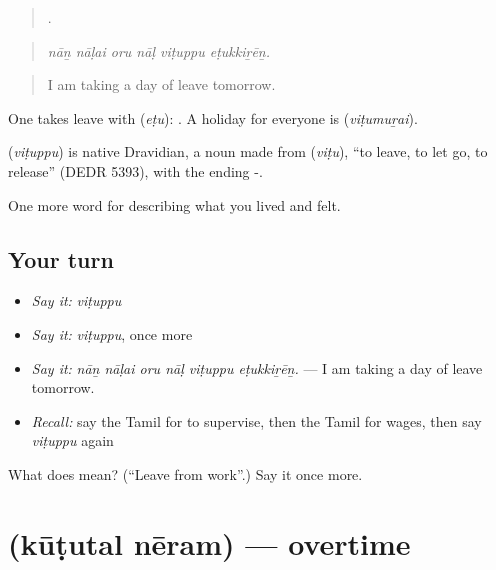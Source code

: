 \begin{quote}
     .
\end{quote}

\begin{quote}
\emph{nāṉ nāḷai oru nāḷ viṭuppu eṭukkiṟēṉ.}
\end{quote}

\begin{quote}
I am taking a day of leave tomorrow.
\end{quote}

One takes leave with  (\emph{eṭu}):  . A holiday for everyone is  (\emph{viṭumuṟai}).

\begin{cousinweb}
\textbf{} (\emph{viṭuppu}) is native Dravidian, a noun made from  (\emph{viṭu}), \textquotedblleft{}to leave, to let go, to release\textquotedblright{} (DEDR 5393), with the ending -.
\end{cousinweb}

\begin{grammarlens}[title={What you've built}]
One more word for describing what you lived and felt.
\end{grammarlens}

\subsection*{Your turn}
\begin{itemize}
\raggedright
  \item \emph{Say it:} \emph{viṭuppu}
  \item \emph{Say it:} \emph{viṭuppu}, once more
  \item \emph{Say it:} \emph{nāṉ nāḷai oru nāḷ viṭuppu eṭukkiṟēṉ.} — I am taking a day of leave tomorrow.
  \item \emph{Recall:} say the Tamil for to supervise, then the Tamil for wages, then say \emph{viṭuppu} again
\end{itemize}

\begin{tcolorbox}[breakable,colback=teal!4,colframe=teal!35!black,title={Before you move on}]
What does  mean? (\textquotedblleft{}Leave from work\textquotedblright{}.) Say it once more.
\end{tcolorbox}
\section[\texorpdfstring{\ta{கூடுதல்} \ta{நேரம்} (kūṭutal nēram)}{கூடுதல் நேரம் (kūṭutal nēram)}]{  (kūṭutal nēram) — overtime}


